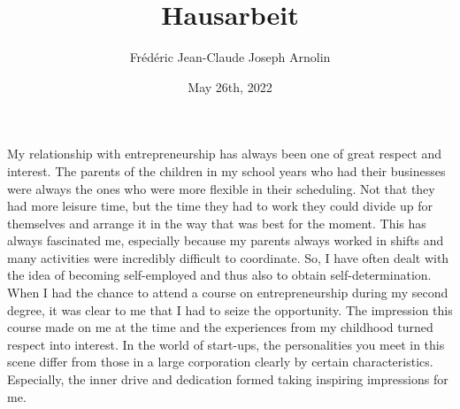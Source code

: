 \documentclass[
	12pt, %
]{fphw}
\title{Hausarbeit} %
\author{Frédéric Jean-Claude Joseph Arnolin} %
\date{May 26th, 2022} %
\institute{Hochschule Reutlingen - Reutlingen University} %
\begin{document}


\maketitle %


My relationship with \cite[p.34]{Welge.2017} entrepreneurship has always been one of great respect and interest. The parents of the children in my school years who had their businesses were always  the ones who were more flexible in their scheduling. Not that they had more leisure time, but the time they had to work they could divide up for themselves and arrange it in the way that was best for the moment. This has always fascinated me, especially because my parents always worked in shifts and many activities were incredibly difficult to coordinate. So, I have often dealt with the idea of becoming self-employed and thus also to obtain self-determination. When I had the chance to attend a course on entrepreneurship during my second degree, it was clear to me that I had to seize the opportunity. The impression this course made on me at the time and the experiences from my childhood turned respect into interest. In the world of start-ups, the personalities you meet in this scene differ from those in a large corporation clearly by certain characteristics. Especially, the inner drive and dedication formed taking inspiring impressions for me.



\newpage


\end{document}
